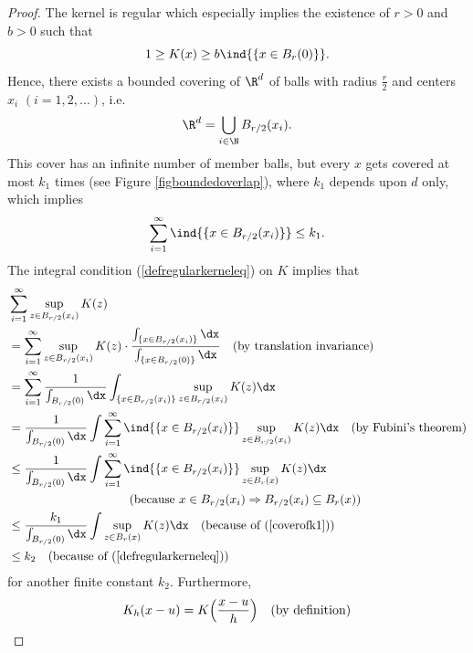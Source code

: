 \begin{proof}
    The kernel is regular which especially implies the existence of $r>0$ and $b>0$ such that \[ 1 \geq K(x) \geq b \ind{\{x \in B_r(0)\}}. \]
    Hence, there exists a bounded covering of $\R^d$ of balls with radius $\frac{r}{2}$ and centers $x_i$ $(i=1,2,...)$, i.e.\@
    $$\R^d = \bigcup_{i \in \N} B_{r/2}(x_i).$$
    This cover has an infinite number of member balls, but every $x$ gets covered at most $k_1$ times (see Figure \ref{figboundedoverlap}), where $k_1$ depends upon $d$ only, which implies
    \begin{equation} \label{coverofk1}
        \sum_{i=1}^\infty \ind{\{x \in B_{r/2}(x_i)\}} \leq k_1. 
    \end{equation}
    The integral condition (\ref{defregularkerneleq}) on $K$ implies that
    \begin{align} \label{leqk2}
        &\sum_{i=1}^\infty \sup\limits_{z\in B_{r/2}(x_i)} K(z) \\ 
        &= \sum_{i=1}^\infty \sup\limits_{z\in B_{r/2}(x_i)} K(z) \cdot \frac{\int_{\{x \in B_{r/2}(x_i)\}} \dx}{\int_{\{x \in B_{r/2}(0)\}} \dx} \quad\text{(by translation invariance)} \nonumber \\
        &= \sum_{i=1}^\infty \frac{1}{\int_{B_{r/2}(0)} \dx} \int_{\{x \in B_{r/2}(x_i)\}} \sup\limits_{z\in B_{r/2}(x_i)} K(z) \dx \nonumber\\
        &= \frac{1}{\int_{B_{r/2}(0)} \dx} \int \sum_{i=1}^\infty \ind{\{x \in B_{r/2}(x_i)\}} \sup\limits_{z\in B_{r/2}(x_i)} K(z) \dx \quad\text{(by Fubini's theorem)} \nonumber\\
        &\leq \frac{1}{\int_{B_{r/2}(0)}\dx} \int \sum_{i=1}^\infty \ind{\{x \in B_{r/2}(x_i)\}} \sup\limits_{z\in B_{r}(x)} K(z) \dx  \nonumber \\ &\quad\quad\quad\quad\quad\quad\quad\quad\quad\quad \text{(because $x\in B_{r/2}(x_i) \Rightarrow B_{r/2}(x_i) \subseteq B_r(x)$)} \nonumber\\
        &\leq \frac{k_1}{\int_{B_{r/2}(0)} \dx} \int \sup\limits_{z \in B_r(x)} K(z) \dx \quad \text{(because of (\ref{coverofk1}))} \nonumber\\
        &\leq k_2 \quad \text{(because of (\ref{defregularkerneleq}))} \nonumber
    \end{align}
    for another finite constant $k_2$. Furthermore,
    \begin{align*}
        K_h(x-u)
        &= K\Bigl(\frac{x-u}{h}\Bigr) \quad\text{(by definition)}\\

\end{align*}
\end{proof}

